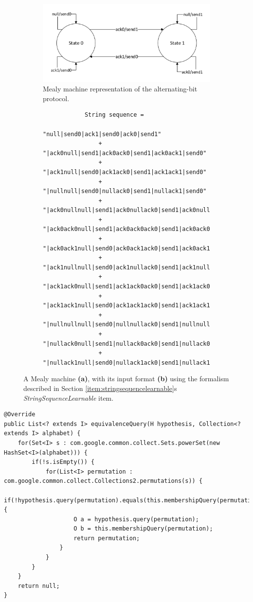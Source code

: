 \begin{figure}[H]
	\centering
	\begin{subfigure}{0.5\linewidth}
		\centering
		\includegraphics[width=1.0\linewidth]{figures/alternatingbit}
		\caption{Mealy machine representation of the alternating-bit protocol.}
	\end{subfigure}
	\begin{subfigure}{0.8\linewidth}
		\centering
		\begin{lstlisting}
			String sequence = 
				"null|send0|ack1|send0|ack0|send1"
				+ "|ack0null|send1|ack0ack0|send1|ack0ack1|send0"
				+ "|ack1null|send0|ack1ack0|send1|ack1ack1|send0"
				+ "|nullnull|send0|nullack0|send1|nullack1|send0"
				+ "|ack0nullnull|send1|ack0nullack0|send1|ack0nullack1|send0"
				+ "|ack0ack0null|send1|ack0ack0ack0|send1|ack0ack0ack1|send0"
				+ "|ack0ack1null|send0|ack0ack1ack0|send1|ack0ack1ack1|send0"
				+ "|ack1nullnull|send0|ack1nullack0|send1|ack1nullack1|send0"
				+ "|ack1ack0null|send1|ack1ack0ack0|send1|ack1ack0ack1|send0"
				+ "|ack1ack1null|send0|ack1ack1ack0|send1|ack1ack1ack1|send0"
				+ "|nullnullnull|send0|nullnullack0|send1|nullnullack1|send0"
				+ "|nullack0null|send1|nullack0ack0|send1|nullack0ack1|send0"
				+ "|nullack1null|send0|nullack1ack0|send1|nullack1ack1|send0";
		\end{lstlisting}
		\caption{}
	\end{subfigure}
	\caption{A Mealy machine \textbf{(a)}, with its input format \textbf{(b)} using the formalism described in Section \ref{item:stringsequencelearnable}s \emph{StringSequenceLearnable} item.}
	\label{fig:alternatingbit}
\end{figure}


\begin{lstlisting}[caption=Brute-force implementation of equivalence queries described in Section \ref{item:stringsequencelearnable}s \emph{StringSequenceAdapter} item using google guavas Sets.powerSet() function.,label=li:eqbruteforce]
@Override
public List<? extends I> equivalenceQuery(H hypothesis, Collection<? extends I> alphabet) {
	for(Set<I> s : com.google.common.collect.Sets.powerSet(new HashSet<I>(alphabet))) {
		if(!s.isEmpty()) {
			for(List<I> permutation : com.google.common.collect.Collections2.permutations(s)) {
				if(!hypothesis.query(permutation).equals(this.membershipQuery(permutation))) {
					O a = hypothesis.query(permutation);
					O b = this.membershipQuery(permutation);
					return permutation;
				}
			}
		}
	}
	return null;
}
\end{lstlisting}

